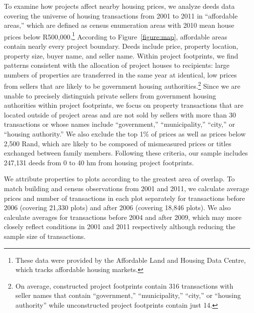 \documentclass[12pt]{article}
\begin{document}
To examine how projects affect nearby housing prices, we analyze deeds data covering the universe of housing transactions from 2001 to 2011 in ``affordable areas,'' which are defined as census enumeration areas with 2010 mean house prices below R500,000.\footnote{These data were provided by the Affordable Land and Housing Data Centre, which tracks affordable housing markets.}  According to Figure~\ref{figure:map}, affordable areas contain nearly every project boundary.  Deeds include price, property location, property size, buyer name, and seller name.  Within project footprints, we find patterns consistent with the allocation of project houses to recipients: large numbers of properties are transferred in the same year at identical, low prices from sellers that are likely to be government housing authorities.\footnote{On average, constructed project footprints contain 316 transactions with seller names that contain ``government,'' ``municipality,'' ``city,'' or ``housing authority'' while unconstructed project footprints contain just 14.}  Since we are unable to precisely distinguish private sellers from government housing authorities within project footprints, we focus on property transactions that are located outside of project areas and are not sold by sellers with more than 30 transactions or whose names include ``government,'' ``municipality,'' ``city,'' or ``housing authority.''  We also exclude the top 1\% of prices as well as prices below 2,500 Rand, which are likely to be composed of mismeasured prices or titles exchanged between family members.  Following these criteria, our sample includes 247,131 deeds from 0 to 40 hm from housing project footprints.  

We attribute properties to plots according to the greatest area of overlap.  To match building and census observations from 2001 and 2011, we calculate average prices and number of transactions in each plot separately for transactions before 2006 (covering 21,330 plots) and after 2006 (covering 18,846 plots).  We also calculate averages for transactions before 2004 and after 2009, which may more closely reflect conditions in 2001 and 2011 respectively although reducing the sample size of transactions.







\end{document}
